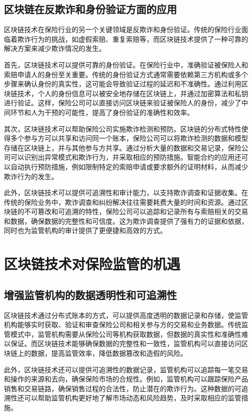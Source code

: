 \documentclass[a4paper,12pt]{ctexart}
\begin{document}
\subsection{区块链在反欺诈和身份验证方面的应用}

区块链技术在保险行业的另一个关键领域是反欺诈和身份验证。传统的保险行业面临着欺诈行为的挑战，如虚假索赔、重复索赔等，而区块链技术提供了一种可靠的解决方案来减少欺诈情况的发生。

首先，区块链技术可以提供可靠的身份验证。在保险行业中，准确验证被保险人和索赔申请人的身份至关重要。传统的身份验证方式通常需要依赖第三方机构或多个步骤来确认身份的真实性，这可能会导致验证过程的延迟和不准确性。通过利用区块链技术，个人的身份信息可以被安全地存储在区块链上，并通过加密算法和私钥进行验证。这样，保险公司可以直接访问区块链来验证被保险人的身份，减少了中间环节和人为干预的可能性，提高了身份验证的准确性和效率。

其次，区块链技术可以帮助保险公司实施欺诈检测和预防。区块链的分布式特性使得多个参与方可以共享和访问同一个账本，保险公司可以将欺诈检测的数据和模型存储在区块链上，并与其他参与方共享。通过分析大量的数据和交易记录，保险公司可以识别出异常模式和欺诈行为，并采取相应的预防措施。智能合约的应用还可以自动执行预防措施，例如限制特定的索赔申请或要求额外的证明材料，从而减少欺诈行为的发生。

此外，区块链技术可以提供可追溯性和审计能力，以支持欺诈调查和证据收集。在传统的保险业务中，欺诈调查和纠纷解决往往需要耗费大量的时间和资源。通过区块链的不可篡改和可追溯的特性，保险公司可以追踪和记录所有与索赔相关的交易和数据，确保数据的完整性和可信度。这为欺诈调查提供了强有力的证据和依据，同时也为监管机构的审计提供了更便捷和高效的方式。

\section{区块链技术对保险监管的机遇}

\subsection{增强监管机构的数据透明性和可追溯性}
区块链技术通过分布式账本的方式，可以提供高度透明的数据记录和存储，使监管机构能够实时获取、验证和审查保险公司和相关参与方的交易和业务数据。传统监管模式中，监管机构需要从保险公司等机构获取数据，但数据的真实性和准确性难以保证。而区块链技术能够确保数据的完整性和一致性，监管机构可以直接访问区块链上的数据，提高监管效率，降低数据篡改和造假的风险。

此外，区块链技术还可以提供可追溯性的数据记录，监管机构可以追踪每一笔交易和操作的来源和去向，确保保险市场的合规性。例如，监管机构可以跟踪保险产品销售和交易链路，确保销售过程的合法性，防止潜在的欺诈行为。这种数据的可追溯性还可以帮助监管机构更好地了解市场动态和风险趋势，及时采取相应的监管措施。
\end{document}
